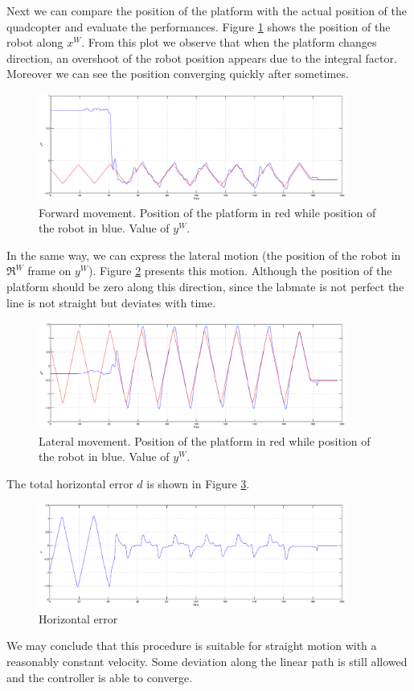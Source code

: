 \noindent
Next we can compare the position of the platform with the actual position of the quadcopter and evaluate the performances. Figure \ref{figure:forward} shows the position of the robot along $x^W$. From this plot we observe that when the platform changes direction, an overshoot of the robot position appears due to the integral factor. Moreover we can see the position converging quickly after sometimes. 
 
   \begin{figure}[h]
    \centering
      \includegraphics[width = 0.9\textwidth ]{wy.eps}
       \caption[Lateral movement]{Forward movement. Position of the platform in red while position of the robot in blue. Value of $y^W$.}
      \label{figure:forward}
   \end{figure}
   
\noindent
In the same way, we can express the lateral motion (the position of the robot in $\Re^W$ frame on $y^W$). Figure \ref{figure:lateral} presents this motion. Although the position of the platform should be zero along this direction, since the labmate is not perfect the line is not straight but deviates with time.
  \begin{figure}[H]
    \centering
      \includegraphics[width = 0.9\textwidth ]{wx.eps}
       \caption[Lateral movement]{Lateral movement. Position of the platform in red while position of the robot in blue. Value of $y^W$.}
      \label{figure:lateral}
   \end{figure}
   
\noindent
The total horizontal error $d$ is shown in Figure \ref{figure:err}.
\begin{figure}[h]
    \centering
      \includegraphics[width = 0.9\textwidth]{d.eps}
       \caption{Horizontal error }
      \label{figure:err}
\end{figure}


We may conclude that this procedure is suitable for straight motion with a reasonably constant velocity. Some deviation along the linear path is still allowed and the controller is able to converge.